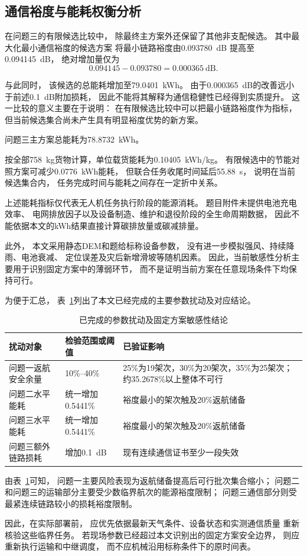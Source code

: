 \subsection{通信裕度与能耗权衡分析}

在问题三的有限候选比较中，
除最终主方案外还保留了其他非支配候选。
其中最大化最小通信裕度的候选方案
将最小链路裕度由0.093780~dB
提高至0.094145~dB，
绝对增加量仅为
\begin{equation}
0.094145-0.093780
=
0.000365~\mathrm{dB}.
\end{equation}

与此同时，
该候选的总能耗增加至79.0401~kWh。
由于0.000365~dB的改善远小于前述0.1~dB附加损耗，
因此不能将其解释为通信稳健性已经得到实质提升。
这一比较的意义主要在于说明：
在有限候选比较中可以把最小链路裕度作为指标，
但当前候选集合尚未产生具有明显裕度优势的新方案。

问题三主方案总能耗为78.8732~kWh。

按全部758~kg货物计算，单位载货能耗为0.10405~kWh/kg。
有限候选中的节能对照方案可减少0.0776~kWh能耗，
但联合任务收尾时间延后55.88~s，
说明在当前候选集合内，
任务完成时间与能耗之间存在一定折中关系。

上述能耗指标仅代表无人机任务执行阶段的能源消耗。
题目附件未提供电池充电效率、
电网排放因子以及设备制造、维护和退役阶段的全生命周期数据，
因此不能依据本文的kWh结果直接计算碳排放量或碳减排量。

此外，
本文采用静态DEM和题给标称设备参数，
没有进一步模拟强风、持续降雨、电池衰减、
定位误差及灾后新增滑坡等随机因素。
因此，当前敏感性分析主要用于识别固定方案中的薄弱环节，
而不是证明当前方案在任意现场条件下均保持可行。

为便于汇总，
表~\ref{tab:sensitivity_summary}列出了本文已经完成的主要参数扰动及对应结论。

\begin{table}[H]\centering\normalsize
\caption{已完成的参数扰动及固定方案敏感性结论}\label{tab:sensitivity_summary}
\begin{tabular}{@{}p{3.4cm}p{3.6cm}p{7.0cm}@{}}\toprule
扰动对象 & 检验范围或阈值 & 已验证影响\\\midrule
问题一返航安全余量 & 10\%--40\% & 25\%为19架次，30\%为20架次，35\%为25架次；约35.2678\%以上整体不可行\\
问题二水平能耗 & 统一增加0.5441\% & 裕度最小的架次触及20\%返航储备\\
问题三水平能耗 & 统一增加0.5441\% & 裕度最小的架次触及20\%返航储备\\
问题三额外链路损耗 & 增加0.1~dB & 现有连续通信证书至少一段失效\\\bottomrule
\end{tabular}\end{table}

由表~\ref{tab:sensitivity_summary}可知，
问题一主要风险表现为返航储备提高后可行批次集合缩小；
问题二和问题三的运输部分主要受少数临界航次的能源裕度限制；
问题三通信部分则受最紧连续链路较小的损耗裕度限制。

因此，在实际部署前，
应优先依据最新天气条件、设备状态和实测通信质量
重新核验这些临界任务。
若现场参数已经超过本文识别出的固定方案安全边界，
则应重新执行运输和中继调度，
而不应机械沿用标称条件下的原时间表。







